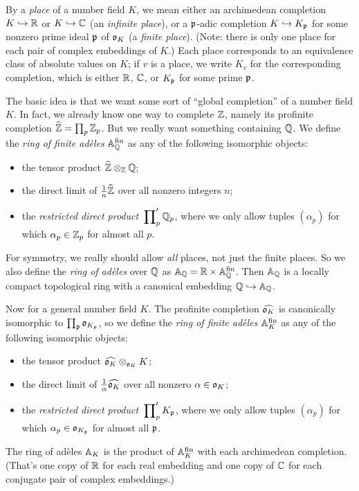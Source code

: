 By a \emph{place} of a number field $K$, we mean either an archimedean
completion $K \hookrightarrow \RR$ or $K \hookrightarrow \CC$
(an \emph{infinite place}), or a
$\gothp$-adic completion $K \hookrightarrow K_\gothp$ for some nonzero
prime ideal $\gothp$ of $\gotho_K$ (a \emph{finite place}). (Note:
there is only one place for each pair of complex embeddings of $K$.)
Each place corresponds to an equivalence class of absolute values on
$K$; if $v$ is a place, we write $K_v$ for the corresponding completion,
which is either $\RR$, $\CC$, or $K_\gothp$ for some prime $\gothp$.


The basic idea is that we want some sort of ``global completion'' of a
number field $K$. In fact, we already know one way to complete $\ZZ$,
namely its profinite completion $\widehat{\ZZ} = \prod_p \ZZ_p$. But we
really want something containing $\QQ$. We define the \emph{ring of
finite ad\`eles} $\AA^{\fin}_\QQ$ as any of the following isomorphic objects:
\begin{itemize}
\item the tensor product $\widehat{\ZZ} \otimes_{\ZZ} \QQ$;
\item the direct limit of $\frac{1}{n} \widehat{\ZZ}$ over all nonzero
integers $n$;
\item the \emph{restricted direct product} $\sideset{}{'_p}\prod \QQ_p$,
where we only allow tuples $(\alpha_p)$ for which $\alpha_p \in \ZZ_p$
for almost all $p$.
\end{itemize}
For symmetry, we really should allow \emph{all} places, not just the finite
places. So we also define the \emph{ring of ad\`eles} over $\QQ$ as
$\AA_{\QQ} = \RR \times \AA^{\fin}_{\QQ}$. Then $\AA_{\QQ}$ is a locally
compact topological ring with a canonical embedding $\QQ \hookrightarrow
\AA_{\QQ}$.

Now for a general number field $K$.
The profinite completion
$\widehat{\gotho_K}$ is canonically isomorphic to $\prod_{\gothp}
\gotho_{K_{\gothp}}$, so we define the \emph{ring of finite ad\`eles}
$\AA^{\fin}_{K}$ as any of the following isomorphic objects:
\begin{itemize}
\item the tensor product $\widehat{\gotho_K} \otimes_{\gotho_K} K$;
\item the direct limit of $\frac{1}{\alpha} \widehat{\gotho_K}$ over all
nonzero $\alpha \in \gotho_K$;
\item the \emph{restricted direct product} $\sideset{}{'_p}\prod K_{\gothp}$,
where we only allow tuples $(\alpha_p)$ for which $\alpha_p \in \gotho_{K_{\gothp}}$
for almost all $\gothp$.
\end{itemize}
The ring of ad\`eles $\AA_K$ is the product of $\AA^{\fin}_K$ with each
archimedean completion. (That's one copy of $\RR$ for each real embedding and
one copy of $\CC$ for each conjugate pair of complex embeddings.)

